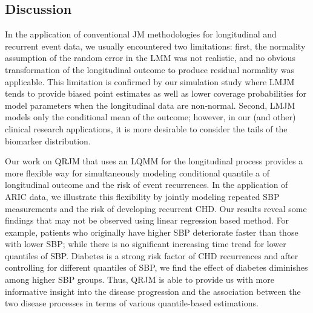 








% 



\subsection{Discussion}\label{sec:p2discussion}
In the application of conventional JM methodologies for longitudinal and recurrent event data, we usually encountered two limitations: first, the normality assumption of the random error in the LMM was not realistic, and no obvious transformation of the longitudinal outcome to produce residual normality was applicable. This limitation is confirmed by our simulation study where LMJM tends to provide biased point estimates as well as lower coverage probabilities for model parameters when the longitudinal data are non-normal. Second, LMJM models only the conditional mean of the outcome; however, in our (and other) clinical research applications, it is more desirable to consider the tails of the biomarker distribution.

Our work on QRJM that uses an LQMM for the longitudinal process provides a more flexible way for simultaneously modeling conditional quantile a of longitudinal outcome and the risk of event recurrences. In the application of ARIC data, we illustrate this flexibility by jointly modeling repeated SBP measurements and the risk of developing recurrent CHD. Our results reveal some findings that may not be observed using linear regression based method. For example, patients who originally have higher SBP deteriorate faster than those with lower SBP; while there is no significant increasing time trend for lower quantiles of SBP. Diabetes is a strong risk factor of CHD recurrences and after controlling for different quantiles of SBP, we find the effect of diabetes diminishes among higher SBP groups. Thus, QRJM is able to provide us with more informative insight into the disease progression and the association between the two disease processes in terms of various quantile-based estimations.

